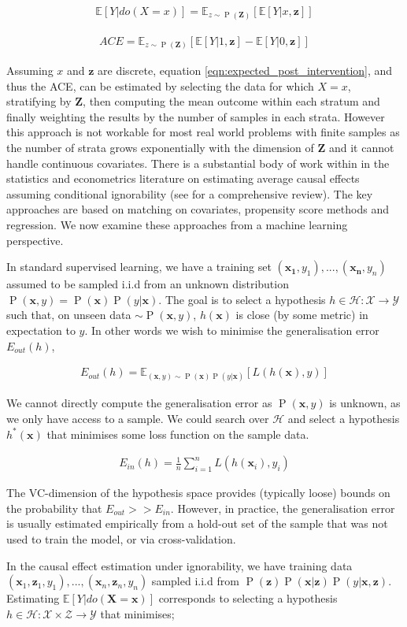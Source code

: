 \documentclass[11pt,a4paper,twoside]{report}
\newcommand{\vb}[1]{\boldsymbol{#1}}
\newcommand{\Esub}[2]{\mathbb E_{#1}\left[{#2}\right]}
\newcommand{\E}[1]{\mathbb E\left[{#1}\right]}
\newcommand{\eqn}[1]{\begin{align}#1\end{align}}
\renewcommand{\P}[1]{\operatorname{P}\left(#1\right)}
\theoremstyle{plain}
\theoremstyle{definition}
\begin{document}
\eqn{
\label{eqn:expected_post_intervention}
\E{Y|do(X=x)} = \Esub{z\sim \P{\vb{Z}}}{\E{Y|x,\vb{z}}}
} 

\eqn{
\label{eqn:ace_ignoreable}
ACE = \Esub{z\sim \P{\vb{Z}}}{\E{Y|1,\vb{z}}-\E{Y|0,\vb{z}}}
}  

Assuming $x$ and $\vb{z}$ are discrete, equation \ref{eqn:expected_post_intervention}, and thus the ACE, can be estimated by selecting the data for which $X=x$, stratifying by $\vb{Z}$, then computing the mean outcome within each stratum and finally weighting the results by the number of samples in each strata. However this approach is not workable for most real world problems with finite samples as the number of strata grows exponentially with the dimension of $\vb{Z}$ and it cannot handle continuous covariates. There is a substantial body of work within in the statistics and econometrics literature on estimating average causal effects assuming conditional ignorability (see \citet{Imbens2004} for a comprehensive review). The key approaches are based on matching on covariates, propensity score methods and regression. We now examine these approaches from a machine learning perspective. 

In standard supervised learning, we have a training set $(\vb{x_1},y_1),...,(\vb{x_n},y_n)$ assumed to be sampled i.i.d from an unknown distribution $\P{\vb{x},y} =\P{\vb{x}}\P{y|\vb{x}}$. The goal is to select a hypothesis $h \in \mathcal{H} : \mathcal{X} \rightarrow \mathcal{Y}$ such that, on unseen data $ \sim \P{\vb{x},y}$, $h(\vb{x})$ is close (by some metric) in expectation to $y$. In other words we wish to minimise the generalisation error $E_{out}(h)$,

\eqn{
E_{out}(h) = \Esub{(\vb{x},y)\sim \P{\vb{x}}\P{y|\vb{x}}}{L(h(\vb{x}),y)}
}

We cannot directly compute the generalisation error as $\P{\vb{x},y}$ is unknown, as we only have access to a sample. We could search over $\mathcal{H}$ and select a hypothesis $h^*(\vb{x})$ that minimises some loss function on the sample data.

\eqn{
E_{in}(h) = \frac{1}{n}\sum_{i=1}^n L(h(\vb{x}_i),y_i)
}

The VC-dimension of the hypothesis space provides (typically loose) bounds on the probability that $E_{out} >> E_{in}$. However, in practice, the generalisation error is usually estimated empirically from a hold-out set of the sample that was not used to train the model, or via cross-validation. 

In the causal effect estimation under ignorability, we have training data $(\vb{x}_1,\vb{z}_1,y_1),...,(\vb{x}_n,\vb{z}_n,y_n)$ sampled i.i.d from $\P{\vb{z}}\P{\vb{x}|\vb{z}}\P{y|\vb{x},\vb{z}}$. Estimating $\E{Y|do(\vb{X}=\vb{x})}$ corresponds to selecting a hypothesis $h \in \mathcal{H}:\mathcal{X} \times \mathcal{Z} \rightarrow \mathcal{Y}$ that minimises;
\end{document}
